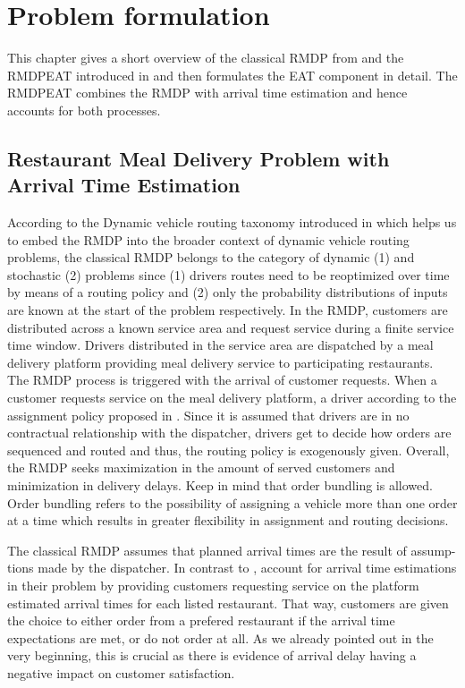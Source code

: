 \chapter{Problem formulation}

This chapter gives a short overview of the classical RMDP from \cite{UlmerRMDP} and the RMDPEAT introduced in \cite{Hildebrandt2020_EAT} and then formulates the EAT component in detail. The RMDPEAT combines the RMDP with arrival time estimation and hence accounts for both processes. 
\section{Restaurant Meal Delivery Problem with Arrival Time Estimation}
According to the Dynamic vehicle routing taxonomy introduced in \cite{psaraftis} which helps us to embed the RMDP into the broader context of dynamic vehicle routing problems, the classical RMDP belongs to the category of dynamic (1) and stochastic (2) problems since (1) drivers routes need to be reoptimized over time by means of a routing policy and (2) only the probability distributions of inputs are known at the start of the problem respectively. In the RMDP, customers are distributed across a known service area and request service during a finite service time window. Drivers distributed in the service area are dispatched by a meal delivery platform providing meal delivery service to participating restaurants. The RMDP process is triggered with the arrival of customer requests. When a customer requests service on the meal delivery platform, a driver according to the assignment policy proposed in \cite{UlmerRMDP}. Since it is assumed that drivers are in no contractual relationship with the dispatcher, drivers get to decide how orders are sequenced and routed and thus, the routing policy is exogenously given. Overall, the RMDP seeks maximization in the amount of served customers and minimization in delivery delays. Keep in mind that order bundling is allowed. Order bundling refers to the possibility of assigning a vehicle more than one order at a time which results in greater flexibility in assignment and routing decisions.

The classical RMDP assumes that planned arrival times are the result of assump-tions made by the dispatcher. In contrast to \citet{UlmerRMDP}, \citet{Hildebrandt2020_EAT} account for arrival time estimations in their problem by providing customers requesting service on the platform estimated arrival times for each listed restaurant. That way, customers are given the choice to either order from a prefered restaurant if the arrival time expectations are met, or do not order at all. As we already pointed out in the very beginning, this is crucial as there is evidence of arrival delay having a negative impact on customer satisfaction. 

